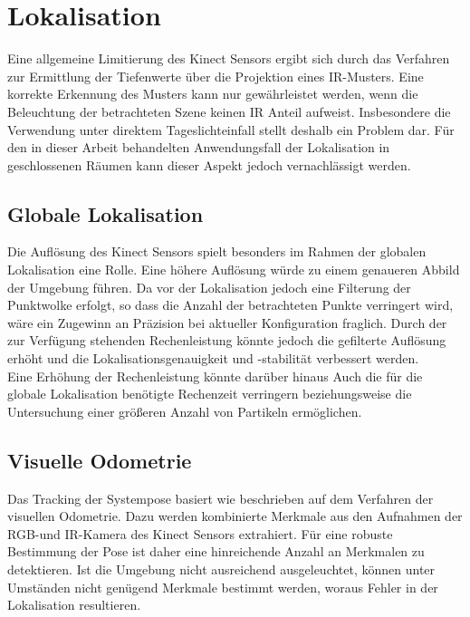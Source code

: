 \section{Lokalisation}

Eine allgemeine Limitierung des Kinect Sensors ergibt sich durch das Verfahren zur Ermittlung der Tiefenwerte über die Projektion eines IR-Musters. Eine korrekte Erkennung des Musters kann nur gewährleistet werden, wenn die Beleuchtung der betrachteten Szene keinen \red[starken] IR Anteil aufweist. Insbesondere die Verwendung unter direktem Tageslichteinfall stellt deshalb ein Problem dar. Für den in dieser Arbeit behandelten Anwendungsfall der Lokalisation in geschlossenen Räumen kann dieser Aspekt jedoch vernachlässigt werden.

\subsection{Globale Lokalisation}
Die Auflösung des Kinect Sensors spielt besonders im Rahmen der globalen Lokalisation eine Rolle. Eine höhere Auflösung würde zu einem genaueren Abbild der Umgebung führen. Da vor der Lokalisation jedoch eine Filterung der Punktwolke erfolgt, so dass die Anzahl der betrachteten Punkte verringert wird, wäre ein Zugewinn an Präzision bei aktueller Konfiguration fraglich. Durch \red[Steigerung] der zur Verfügung stehenden Rechenleistung könnte jedoch die gefilterte Auflösung erhöht und die Lokalisationsgenauigkeit und -stabilität verbessert werden.\\

Eine Erhöhung der Rechenleistung könnte darüber hinaus Auch die für die globale Lokalisation benötigte Rechenzeit verringern beziehungsweise die Untersuchung einer größeren Anzahl von Partikeln ermöglichen.\\

\subsection{Visuelle Odometrie}
Das Tracking der Systempose basiert wie beschrieben auf dem Verfahren der visuellen Odometrie. Dazu werden kombinierte Merkmale aus den Aufnahmen der RGB-und IR-Kamera des Kinect Sensors extrahiert. Für eine robuste Bestimmung der Pose ist daher eine hinreichende Anzahl an Merkmalen zu detektieren. Ist die Umgebung nicht ausreichend ausgeleuchtet, können unter Umständen nicht genügend Merkmale bestimmt werden, woraus Fehler in der Lokalisation resultieren. 

